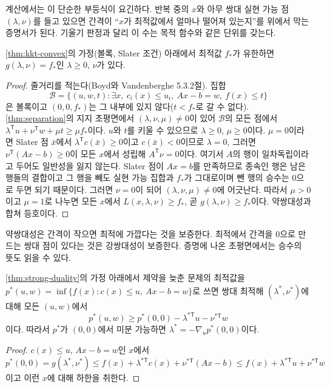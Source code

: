 계산에서는 이 단순한 부등식이 요긴하다. 반복 중의 $x$와 아무 쌍대 실현 가능 점 $(\lambda,\nu)$를 들고 있으면 간격이 ``$x$가 최적값에서 얼마나 떨어져 있는지''를 위에서 막는 증명서가 된다. 기울기 판정과 달리 이 수는 목적 함수와 같은 단위를 갖는다.

\begin{theorem}[강쌍대성]
\label{thm:strong-duality}
\cref{thm:kkt-convex}의 가정(볼록, Slater 조건) 아래에서 최적값 $f_\ast$가 유한하면 $g(\lambda,\nu)=f_\ast$인 $\lambda\ge0$, $\nu$가 있다.
\end{theorem}

\begin{proof}
줄거리를 적는다(Boyd와 Vandenberghe\cite{boyd2004convex} 5.3.2절). 집합
\[
\mathcal B=\{(u,w,t):\exists x,\ c_i(x)\le u_i,\ Ax-b=w,\ f(x)\le t\}
\]
은 볼록이고 $(0,0,f_\ast)$는 그 내부에 있지 않다($t<f_\ast$로 갈 수 없다). \cref{thm:separation}의 지지 초평면에서 $(\lambda,\nu,\mu)\ne0$이 있어 $\mathcal B$의 모든 점에서 $\lambda^{\mathsf T}u+\nu^{\mathsf T}w+\mu t\ge\mu f_\ast$이다. $u$와 $t$를 키울 수 있으므로 $\lambda\ge0$, $\mu\ge0$이다. $\mu=0$이라면 Slater 점 $\bar x$에서 $\lambda^{\mathsf T}c(\bar x)\ge0$이고 $c(\bar x)<0$이므로 $\lambda=0$, 그러면 $\nu^{\mathsf T}(Ax-b)\ge0$이 모든 $x$에서 성립해 $A^{\mathsf T}\nu=0$이다. 여기서 $A$의 행이 일차독립이라고 두어도 일반성을 잃지 않는다. Slater 점이 $Ax=b$를 만족하므로 종속인 행은 남은 행들의 결합이고 그 행을 빼도 실현 가능 집합과 $f_\ast$가 그대로이며 뺀 행의 승수는 $0$으로 두면 되기 때문이다. 그러면 $\nu=0$이 되어 $(\lambda,\nu,\mu)\ne0$에 어긋난다. 따라서 $\mu>0$이고 $\mu=1$로 나누면 모든 $x$에서 $L(x,\lambda,\nu)\ge f_\ast$, 곧 $g(\lambda,\nu)\ge f_\ast$이다. 약쌍대성과 합쳐 등호이다.
\end{proof}

약쌍대성은 간격이 작으면 최적에 가깝다는 것을 보증한다. 최적에서 간격을 $0$으로 만드는 쌍대 점이 있다는 것은 강쌍대성이 보증한다. 증명에 나온 초평면에서는 승수의 뜻도 읽을 수 있다.

\begin{corollary}[승수의 감도]
\label{cor:sensitivity}
\cref{thm:strong-duality}의 가정 아래에서 제약을 늦춘 문제의 최적값을 $p^\ast(u,w)=\inf\{f(x):c(x)\le u,\ Ax-b=w\}$로 쓰면 쌍대 최적해 $(\lambda^\ast,\nu^\ast)$에 대해 모든 $(u,w)$에서
\[
p^\ast(u,w)\ge p^\ast(0,0)-\lambda^{\ast\mathsf T}u-\nu^{\ast\mathsf T}w
\]
이다. 따라서 $p^\ast$가 $(0,0)$에서 미분 가능하면 $\lambda^\ast=-\nabla_up^\ast(0,0)$이다.
\end{corollary}

\begin{proof}
$c(x)\le u$, $Ax-b=w$인 $x$에서 $p^\ast(0,0)=g(\lambda^\ast,\nu^\ast)\le f(x)+\lambda^{\ast\mathsf T}c(x)+\nu^{\ast\mathsf T}(Ax-b)\le f(x)+\lambda^{\ast\mathsf T}u+\nu^{\ast\mathsf T}w$이고 이런 $x$에 대해 하한을 취한다.
\end{proof}

